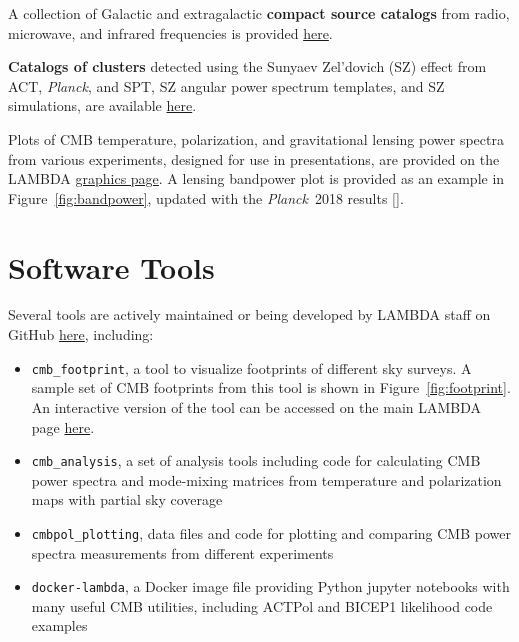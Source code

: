 \documentclass[letter]{emulateapj}
\newcommand{\planck}{\textsl{Planck}}
\begin{document}
A collection of Galactic and extragalactic {\bf compact source catalogs} from radio, microwave, and infrared frequencies is provided \href{https://lambda.gsfc.nasa.gov/product/foreground/fg_comp_source.cfm}{here}.

{\bf Catalogs of clusters} detected using the Sunyaev Zel'dovich (SZ) effect from ACT,  \planck, and SPT, SZ angular power spectrum templates, and SZ simulations, are available \href{https://lambda.gsfc.nasa.gov/product/foreground/fg_sz_cluster.cfm}{here}.

Plots of CMB temperature, polarization, and gravitational lensing power spectra from various experiments, designed for use in presentations, are provided on the LAMBDA  \href{https://lambda.gsfc.nasa.gov/graphics/}{graphics page}. A lensing bandpower plot is provided as an example in Figure~\ref{fig:bandpower}, updated with the \planck\ 2018 results [].

\section{Software Tools}

Several tools are actively maintained or being developed by LAMBDA staff on GitHub \href{https://github.com/nasa-lambda}{here}, including:
\begin{itemize}
\item \texttt{cmb\_footprint}, a tool to visualize footprints of different sky surveys. A sample set of CMB footprints from this tool is shown in Figure~\ref{fig:footprint}. An interactive version of the tool can be accessed on the main LAMBDA page \href{https://lambda.gsfc.nasa.gov/toolbox/footprint/aladin/aladinLAMBDA.cfm}{here}.
\item \texttt{cmb\_analysis}, a set of analysis tools including code for calculating CMB power spectra and mode-mixing matrices from temperature and polarization maps with partial sky coverage
\item \texttt{cmbpol\_plotting}, data files and code for plotting and comparing CMB power spectra measurements from different experiments
\item \texttt{docker-lambda}, a Docker image file providing Python jupyter notebooks with many useful CMB utilities, including ACTPol and BICEP1 likelihood code examples
\end{itemize}
\end{document}
